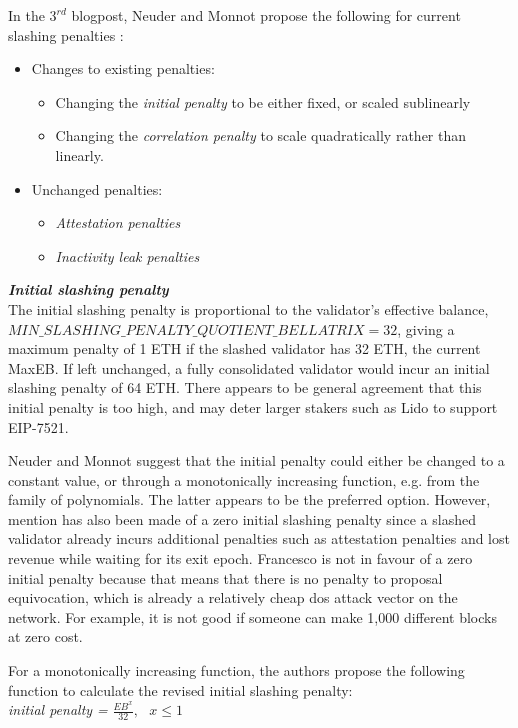 \noindent
In the $3^{rd}$ blogpost, Neuder and Monnot propose the following for current slashing penalties \cite{Neuder2023d}: 
\begin{itemize}
\item Changes to existing penalties:
	\begin{itemize}
	\item Changing the \textit{initial penalty} to be either fixed, or scaled sublinearly
	\item Changing the \textit{correlation penalty} to scale quadratically rather than linearly.
	\end{itemize}
\item Unchanged penalties:
	\begin{itemize}
	\item \textit{Attestation penalties}
	\item \textit{Inactivity leak penalties}
	\end{itemize}
\end{itemize}

\noindent
\textbf{\textit{Initial slashing penalty}} \\
The initial slashing penalty is proportional to the validator's effective balance, $MIN\_SLASHING\_PENALTY\_QUOTIENT\_BELLATRIX=32$, giving a maximum penalty of 1 ETH if the slashed validator has 32 ETH, the current MaxEB.
If left unchanged, a fully consolidated validator would incur an initial slashing penalty of 64 ETH. There appears to be general agreement that this initial penalty is too high, and may deter larger stakers such as Lido to support EIP-7521.

Neuder and Monnot suggest that the initial penalty could either be changed to a constant value, or through a monotonically increasing function, e.g.  from the family of polynomials. The latter appears to be the preferred option. However, mention has also been made of a zero initial slashing penalty since a slashed validator already incurs additional penalties such as attestation penalties and lost revenue while waiting for its exit epoch. Francesco is not in favour of a zero initial penalty because that means that there is no penalty to proposal equivocation, which is already a relatively cheap \gls{dos} attack vector on the network. For example, it is not good if someone can make 1,000 different blocks at zero cost.

For a monotonically increasing function, the authors propose the following function to calculate the revised initial slashing penalty:\\
\textit{initial penalty =} $\frac{EB^x}{32}, \texttt{ } x \leqslant 1$ \\

